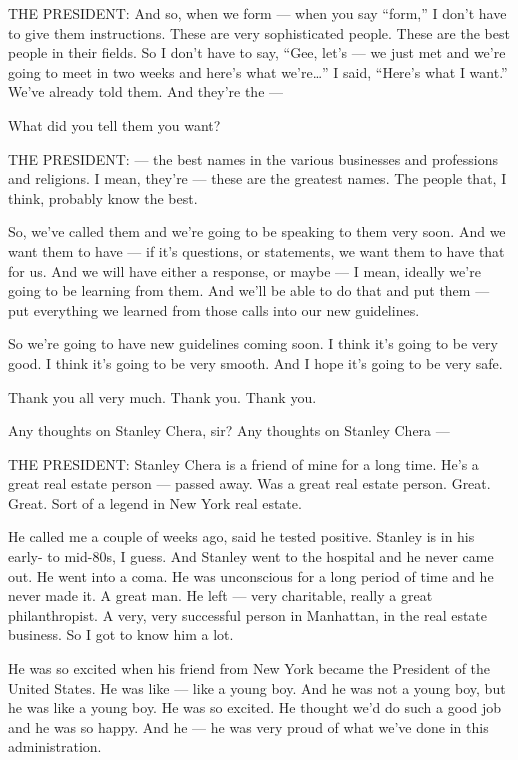 THE PRESIDENT: And so, when we form --- when you say ``form,'' I don't
have to give them instructions. These are very sophisticated people.
These are the best people in their fields. So I don't have to say,
``Gee, let's --- we just met and we're going to meet in two weeks and
here's what we're\ldots{}'' I said, ``Here's what I want.'' We've
already told them. And they're the ---

What did you tell them you want?

THE PRESIDENT: --- the best names in the various businesses and
professions and religions. I mean, they're --- these are the greatest
names. The people that, I think, probably know the best.

So, we've called them and we're going to be speaking to them very soon.
And we want them to have --- if it's questions, or statements, we want
them to have that for us. And we will have either a response, or maybe
--- I mean, ideally we're going to be learning from them. And we'll be
able to do that and put them --- put everything we learned from those
calls into our new guidelines.

So we're going to have new guidelines coming soon. I think it's going to
be very good. I think it's going to be very smooth. And I hope it's
going to be very safe.

Thank you all very much. Thank you. Thank you.

Any thoughts on Stanley Chera, sir? Any thoughts on Stanley Chera ---

THE PRESIDENT: Stanley Chera is a friend of mine for a long time. He's a
great real estate person --- passed away. Was a great real estate
person. Great. Great. Sort of a legend in New York real estate.

He called me a couple of weeks ago, said he tested positive. Stanley is
in his early- to mid-80s, I guess. And Stanley went to the hospital and
he never came out. He went into a coma. He was unconscious for a long
period of time and he never made it. A great man. He left --- very
charitable, really a great philanthropist. A very, very successful
person in Manhattan, in the real estate business. So I got to know him a
lot.

He was so excited when his friend from New York became the President of
the United States. He was like --- like a young boy. And he was not a
young boy, but he was like a young boy. He was so excited. He thought
we'd do such a good job and he was so happy. And he --- he was very
proud of what we've done in this administration.

